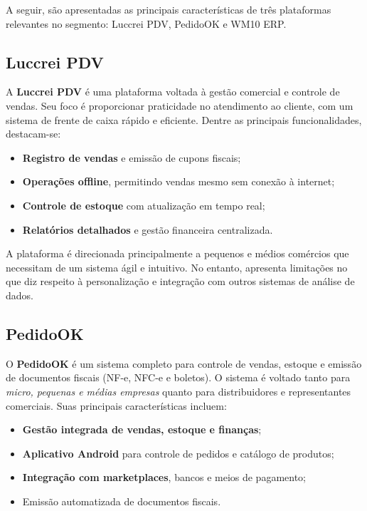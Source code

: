 A seguir, são apresentadas as principais características de três plataformas relevantes no segmento: Luccrei PDV, PedidoOK e WM10 ERP.
\subsection{Luccrei PDV}

A \textbf{Luccrei PDV} é uma plataforma voltada à gestão comercial e controle de vendas. Seu foco é proporcionar praticidade no atendimento ao cliente, com um sistema de frente de caixa rápido e eficiente. Dentre as principais funcionalidades, destacam-se:

\begin{itemize}
    \item \textbf{Registro de vendas} e emissão de cupons fiscais;
    \item \textbf{Operações offline}, permitindo vendas mesmo sem conexão à internet;
    \item \textbf{Controle de estoque} com atualização em tempo real;
    \item \textbf{Relatórios detalhados} e gestão financeira centralizada.
\end{itemize}

A plataforma é direcionada principalmente a pequenos e médios comércios que necessitam de um sistema ágil e intuitivo. No entanto, apresenta limitações no que diz respeito à personalização e integração com outros sistemas de análise de dados.

\subsection{PedidoOK}

O \textbf{PedidoOK} é um sistema completo para controle de vendas, estoque e emissão de documentos fiscais (NF-e, NFC-e e boletos). O sistema é voltado tanto para \textit{micro, pequenas e médias empresas} quanto para distribuidores e representantes comerciais. Suas principais características incluem:

\begin{itemize}
    \item \textbf{Gestão integrada de vendas, estoque e finanças};
    \item \textbf{Aplicativo Android} para controle de pedidos e catálogo de produtos;
    \item \textbf{Integração com marketplaces}, bancos e meios de pagamento;
    \item Emissão automatizada de documentos fiscais.
\end{itemize}

